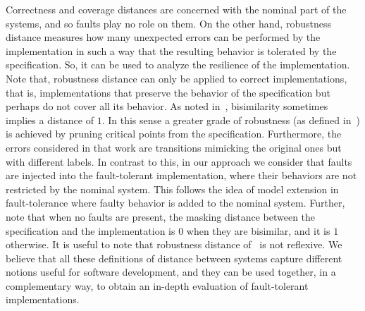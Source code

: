 Correctness and coverage distances are concerned with the nominal part of the systems, 
and so faults play no role on them. On the other hand, robustness distance measures how many unexpected errors can be performed by the implementation in such a way that the resulting behavior is tolerated by the specification. So, it can be used to analyze the resilience of the implementation. Note that, robustness
distance can only be applied to correct implementations, that is, implementations that preserve the behavior of the specification but perhaps do not cover all its behavior. As noted in~\cite{CernyHR12}, bisimilarity sometimes implies a distance of $1$. In this sense a greater grade of robustness (as defined in~\cite{CernyHR12}) is achieved by pruning critical points from the specification. Furthermore, the  errors considered in that work are transitions mimicking the original ones but with different labels. In contrast to this, 
 in our approach we consider that faults are injected into the fault-tolerant 
 implementation, where their behaviors are not restricted by the nominal system. 
 This follows the idea of model extension in fault-tolerance where faulty behavior is added 
 to the nominal system. Further, note that when no faults are present, the masking distance between the specification and the implementation is $0$ when they are bisimilar, and it is $1$ otherwise.
It is useful to note that robustness distance of~\cite{CernyHR12} is not reflexive. We believe that all these definitions of distance between systems capture different notions useful for software development, and they can be used together, in a complementary way, to obtain an in-depth
evaluation of fault-tolerant implementations.





